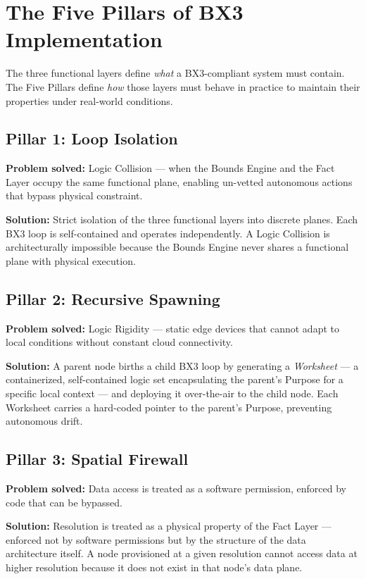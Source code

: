 \documentclass[12pt]{article}
\begin{document}
\section{The Five Pillars of BX3 Implementation}
\label{sec:pillars}

The three functional layers define \textit{what} a BX3-compliant system must contain. The Five Pillars define \textit{how} those layers must behave in practice to maintain their properties under real-world conditions.

\subsection{Pillar 1: Loop Isolation}
\textbf{Problem solved:} Logic Collision --- when the Bounds Engine and the Fact Layer occupy the same functional plane, enabling un-vetted autonomous actions that bypass physical constraint.

\textbf{Solution:} Strict isolation of the three functional layers into discrete planes. Each BX3 loop is self-contained and operates independently. A Logic Collision is architecturally impossible because the Bounds Engine never shares a functional plane with physical execution.

\subsection{Pillar 2: Recursive Spawning}
\textbf{Problem solved:} Logic Rigidity --- static edge devices that cannot adapt to local conditions without constant cloud connectivity.

\textbf{Solution:} A parent node births a child BX3 loop by generating a \textit{Worksheet} --- a containerized, self-contained logic set encapsulating the parent's Purpose for a specific local context --- and deploying it over-the-air to the child node. Each Worksheet carries a hard-coded pointer to the parent's Purpose, preventing autonomous drift.

\subsection{Pillar 3: Spatial Firewall}
\textbf{Problem solved:} Data access is treated as a software permission, enforced by code that can be bypassed.

\textbf{Solution:} Resolution is treated as a physical property of the Fact Layer --- enforced not by software permissions but by the structure of the data architecture itself. A node provisioned at a given resolution cannot access data at higher resolution because it does not exist in that node's data plane.
\end{document}
